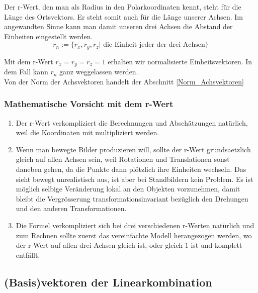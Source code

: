 \documentclass[a4paper]{article}
\begin{document}
Der r-Wert, den man als Radius in den Polarkoordinaten kennt, steht f\"ur die L\"ange des Ortsvektors. Er steht somit auch f\"ur die L\"ange unserer Achsen. Im angewandten Sinne kann man damit unseren drei Achsen die Abstand der Einheiten eingestellt werden.\\


\begin{displaymath}
	r_n := \{ r_x , r_y , r_z | \mbox{ die Einheit jeder der drei Achsen}\}
\end{displaymath}

Mit dem r-Wert $r_x = r_y = r_z = 1$ erhalten wir normalisierte Einheitsvektoren. In dem Fall kann $r_n$ ganz weggelassen werden.\\

Von der Norm der Achsvektoren handelt der Abschnitt \ref{Norm_Achsvektoren}


\subsubsection{Mathematische Vorsicht mit dem r-Wert}

\begin{enumerate}

\item Der r-Wert verkompliziert die Berechnungen und Absch\"atzungen nat\"urlich, weil die Koordinaten mit multipliziert werden. \\

\item Wenn man bewegte Bilder produzieren will, sollte der r-Wert grundsaetzlich gleich auf allen Achsen sein, weil Rotationen und Translationen sonst daneben gehen, da die Punkte dann pl\"otzlich ihre Einheiten wechseln. Das sieht bewegt unrealistisch aus, ist aber
bei Standbildern kein Problem. Es ist m\"oglich selbige Ver\"anderung lokal an den Objekten vorzunehmen, damit bleibt die Vergr\"osserung transformationsinvariant bez\"uglich den Drehungen und den anderen Transformationen.\\

\item Die Formel verkompliziert sich bei drei verschiedenen r-Werten nat\"urlich und zum Rechnen sollte zuerst das vereinfachte Modell
herangezogen werden, wo der r-Wert auf allen drei Achsen gleich ist, oder gleich $1$ ist und komplett entf\"allt.\\

\end{enumerate}

\subsection{(Basis)vektoren der Linearkombination}
\end{document}
